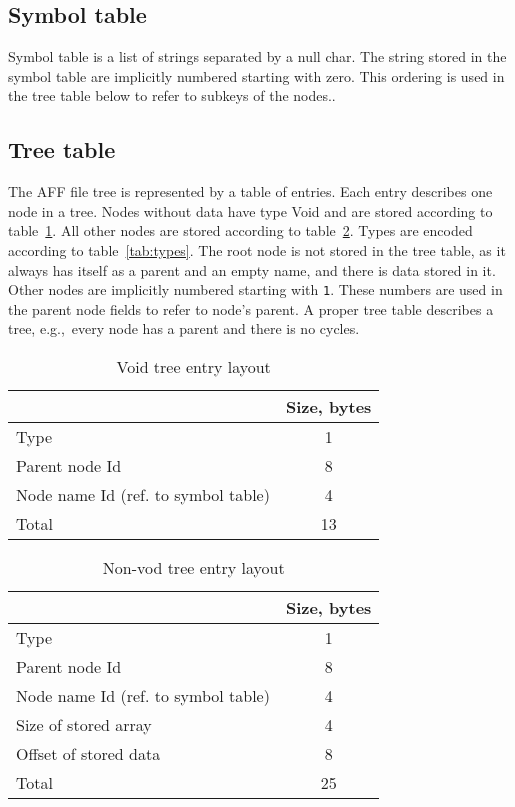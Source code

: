 \documentclass[10pt,letterpaper]{article}
\newcommand{\bc}{\begin{center}}
\newcommand{\ec}{\end{center}}
\newcommand{\ctext}[1]{\texttt{#1}}         %
\begin{document}
\subsection{Symbol table}
Symbol table is a list of strings separated by a null char. The string stored in the symbol table are implicitly numbered starting with zero. This ordering is used in the tree table below to refer to subkeys of the nodes..

\subsection{Tree table}
The AFF file tree is represented by a table of entries. Each entry describes one node in a tree. Nodes without data have type Void and are stored according to table~\ref{tab:void}. All other nodes are stored according to table~\ref{tab:tree_entry}. Types are encoded according to table~\ref{tab:types}. The root node is not stored in the tree table, as it always has itself as a parent and an empty name, and there is data stored in it. Other nodes are implicitly numbered starting with \ctext{1}. These numbers are used in the parent node fields to refer to node's parent. A proper tree table describes a tree, e.g.,~every node has a parent and there is no cycles.

\begin{table}[h]
\bc
\caption{Void tree entry layout}
\label{tab:void}
\begin{tabular}{|l|c|} \hline
 & Size, bytes \\ \hline\hline
Type & 1 \\ \hline
Parent node Id & 8 \\ \hline
Node name Id (ref. to symbol table) & 4 \\ \hline
Total & 13 \\ \hline
\end{tabular}
\ec
\end{table}

\begin{table}[h]
\bc
\caption{Non-vod tree entry layout}
\label{tab:tree_entry}
\begin{tabular}{|l|c|} \hline
 & Size, bytes \\ \hline\hline
Type & 1 \\ \hline
Parent node Id & 8 \\ \hline
Node name Id (ref. to symbol table) & 4 \\ \hline
Size of stored array & 4 \\ \hline
Offset of stored data & 8 \\ \hline
Total & 25 \\ \hline
\end{tabular}
\ec
\end{table}
\end{document}
